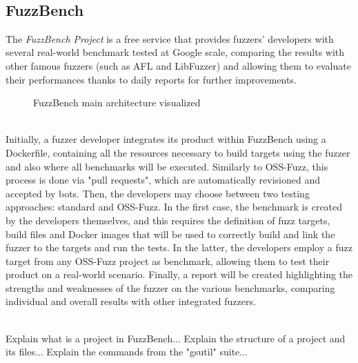 \ \\
\subsection{FuzzBench}
The \textit{FuzzBench Project} \cite{fuzzbench_paper} is a free service that provides fuzzers' developers with several real-world benchmark tested at Google scale, comparing the results with other famous fuzzers (such as AFL and LibFuzzer) and allowing them to evaluate their performances thanks to daily reports for further improvements.
\cite{fuzzbench_docs}
\newline
\begin{figure}[h]
\caption{FuzzBench main architecture visualized \cite{fuzzbench_docs}}
\label{fig:fuzzbench_architecture}
\end{figure}
\ \\
Initially, a fuzzer developer integrates its product within FuzzBench using a Dockerfile, containing all the resources necessary to build targets using the fuzzer and also where all benchmarks will be executed.
\newline
Similarly to OSS-Fuzz, this process is done via "pull requests", which are automatically revisioned and accepted by bots.
\newline \newline
Then, the developers may choose between two testing approaches: standard and OSS-Fuzz.
\newline
In the first case, the benchmark is created by the developers themselves, and this requires the definition of fuzz targets, build files and Docker images that will be used to correctly build and link the fuzzer to the targets and run the tests.
\newline
In the latter, the developers employ a fuzz target from any OSS-Fuzz project as benchmark, allowing them to test their product on a real-world scenario.
\newline \newline
Finally, a report will be created highlighting the strengths and weaknesses of the fuzzer on the various benchmarks, comparing individual and overall results with other integrated fuzzers.

\ \\ \newline \newline \newline
Explain what is a project in FuzzBench...
\newline \newline
Explain the structure of a project and its files...
\newline \newline
Explain the commands from the "gsutil" suite...